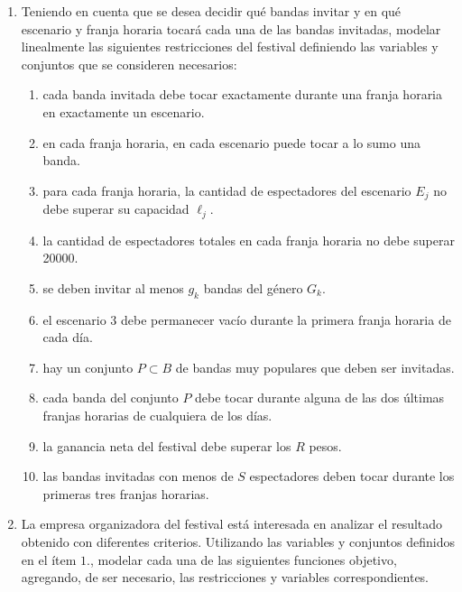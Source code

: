 \documentclass[12pt]{article}
\theoremstyle{definition}
\begin{document}
    \begin{enumerate}
        \item
        Teniendo en cuenta que se desea decidir qué bandas invitar y en qué escenario y franja horaria tocará cada una
        de las bandas invitadas, modelar linealmente las siguientes restricciones del festival definiendo las variables
        y conjuntos que se consideren necesarios:
        
        \begin{enumerate}[label=\emph{\alph*})]
            \item cada banda invitada debe tocar exactamente durante una franja horaria en exactamente un escenario.
            \item en cada franja horaria, en cada escenario puede tocar a lo sumo una banda.
            \item para cada franja horaria, la cantidad de espectadores del escenario $E_j$ no debe superar su capacidad $\ell_j$.
            \item la cantidad de espectadores totales en cada franja horaria no debe superar 20000.
            \item se deben invitar al menos $g_k$ bandas del género $G_k$.
            \item el escenario $3$ debe permanecer vacío durante la primera franja horaria de cada día.
            \item hay un conjunto $P\subset B$ de bandas muy populares que deben ser invitadas.
            \item cada banda del conjunto $P$ debe tocar durante alguna de las dos últimas franjas horarias de cualquiera de los días.
            \item la ganancia neta del festival debe superar los $R$ pesos.
            \item las bandas invitadas con menos de $S$ espectadores deben tocar durante los primeras tres franjas horarias.
        \end{enumerate}
        \item La empresa organizadora del festival está interesada en analizar el resultado obtenido con diferentes criterios. Utilizando las variables y conjuntos definidos en el ítem $1.$, modelar cada una de las siguientes funciones objetivo, agregando, de ser necesario, las restricciones y variables correspondientes.
        \begin{enumerate}[label=\emph{\alph*})]

\end{enumerate}
\end{enumerate}
\end{document}

